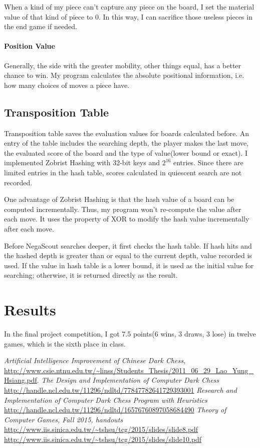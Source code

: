 \documentclass[12pt]{article}
\begin{document}
	When a kind of my piece can't capture any piece on the board, I set the material value of that kind of piece to 0. In this way, I can sacrifice those useless pieces in the end game if needed.
	\paragraph{Position Value}
		Generally, the side with the greater mobility, other things equal, has a better chance to win. My program calculates the absolute positional information, i.e. how many choices of moves a piece have.

\subsection{Transposition Table}
	Transposition table saves the evaluation values for boards calculated before. An entry of the table includes the searching depth, the player makes the last move, the evaluated score of the board and the type of value(lower bound or exact). I implemented Zobrist Hashing with 32-bit keys and $2^{16}$ entries. Since there are limited entries in the hash table, scores calculated in quiescent search are not recorded.
	
	One advantage of Zobrist Hashing is that the hash value of a board can be computed incrementally. Thus, my program won't re-compute the value after each move. It uses the property of XOR to modify the hash value incrementally after each move.
	
	Before NegaScout searches deeper, it first checks the hash table. If hash hits and the hashed depth is greater than or equal to the current depth, value recorded is used. If the value in hash table is a lower bound, it is used as the initial value for searching; otherwise, it is returned directly as the result.

\section*{Results}
	In the final project competition, I got 7.5 points(6 wins, 3 draws, 3 lose) in twelve games, which is the sixth place in class.

\begin{thebibliography}{9}


\bibitem{}  \emph{Artificial Intelligence Improvement of Chinese Dark Chess},\\
	\url{http://www.csie.ntnu.edu.tw/~linss/Students_Thesis/2011_06_29_Lao_Yung_Hsiang.pdf}.
\bibitem{} \emph{The Design and Implementation of Computer Dark Chess}\\
	\url{http://handle.ncl.edu.tw/11296/ndltd/77847782641729393001}
\bibitem{} \emph{Research and Implementation of Computer Dark Chess Program with Heuristics}\\
	\url{http://handle.ncl.edu.tw/11296/ndltd/16576760897058684490}
\bibitem{} \emph{Theory of Computer Games, Fall 2015, handouts}\\
	\url{http://www.iis.sinica.edu.tw/~tshsu/tcg/2015/slides/slide8.pdf}\\
	\url{http://www.iis.sinica.edu.tw/~tshsu/tcg/2015/slides/slide10.pdf}
  

\end{thebibliography}
\end{document}
